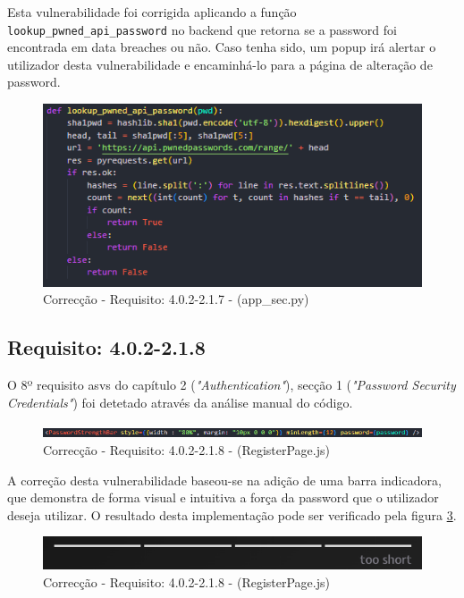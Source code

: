 Esta vulnerabilidade foi corrigida aplicando a função \texttt{lookup\_pwned\_api\_password} no backend que retorna se a password foi encontrada em data breaches ou não. Caso tenha sido, um popup irá alertar o utilizador desta vulnerabilidade e encaminhá-lo para a página de alteração de password.
\begin{figure}[H]
      \centering
      \includegraphics[width=14cm]{images/lookup_pwned_api_password.png}
      \caption{Correcção - Requisito: 4.0.2-2.1.7  - (app\_sec.py)}
      \label{fig:lookup_pwned_api_password}
\end{figure}


\subsection*{Requisito: 4.0.2-2.1.8}
O 8º requisito \ac{asvs} do capítulo 2 (\textit{"Authentication"}), secção 1  (\textit{"Password Security Credentials"}) foi detetado através da análise manual do código.

\begin{figure}[H]
      \centering
      \includegraphics[width=16cm]{images/2_1_8.png}
      \caption{Correcção - Requisito: 4.0.2-2.1.8  - (RegisterPage.js)}
      \label{fig:2_1_8}
\end{figure}

A correção desta vulnerabilidade baseou-se na adição de uma barra indicadora, que demonstra de forma visual e intuitiva a força da password que o utilizador deseja utilizar. O resultado desta implementação pode ser verificado pela figura \ref{fig:2_1_8_barra}.
\begin{figure}[H]
      \centering
      \includegraphics[width=16cm]{images/2_1_8_barra.png}
      \caption{Correcção - Requisito: 4.0.2-2.1.8  - (RegisterPage.js)}
      \label{fig:2_1_8_barra}
\end{figure}

